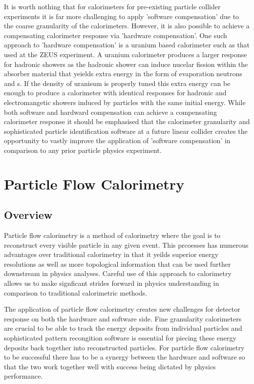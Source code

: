 It is worth nothing that for calorimeters for pre-existing particle collider experiments it is far more challenging to apply 'software compensation' due to the coarse granularity of the calorimeters.  However, it is also possible to achieve a compensating calorimeter response via 'hardware compensation'.  One such approach to 'hardware compensation' is a uranium based calorimeter such as that used at the ZEUS experiment.  A uranium calorimeter produces a larger response for hadronic showers as the hadronic shower can induce nucelar fission within the absorber material that yeields extra energy in the form of evaporation neutrons and \gamma s.  If the density of uranisum is properly tuned this extra energy can be enough to produce a calorimeter with identical responses for hadronic and electromangetic showers induced by particles with the same initial energy.  While both software and hardward compensation can achieve a compensating calorimeter response it should be emphasised that the calorimeter granularity and sophisticated particle identification software at a future linear collider creates the opportunity to vastly improve the application of 'software compensation' in comparison to any prior particle physics experiment.

\section{Particle Flow Calorimetry}
\label{sec:unitarisation}

\subsection{Overview}

Particle flow calorimetry is a method of calorimetry where the goal is to reconstruct every visible particle in any given event.  This prcoesses has numerous advantages over traditional calorimetry in that it yeilds superior energy resolutions as well as more topological information that can be used further downstream in physics analyses.  Careful use of this approach to calorimetry allows us to make signficant strides forward in physics understanding in comparison to traditional calorimetric methods.

The application of particle flow calorimetry creates new challenges for detector response on both the hardware and software side.  Fine granularity calorimeters are crucial to be able to track the energy deposits from individual particles and sophisticated pattern recongition software is essential for piecing these energy deposits back together into reconstructed particles.  For particle flow calorimetry to be successful there has to be a synergy between the hardware and software so that the two work together well with success being dictated by physics performance.  

